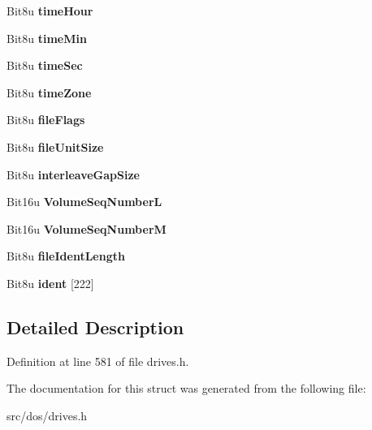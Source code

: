 \begin{DoxyCompactItemize}
\item 
\hypertarget{structisoDirEntry_ad5f7d5ba46e893d19ef699d39a44b875}{Bit8u {\bfseries time\-Hour}}\label{structisoDirEntry_ad5f7d5ba46e893d19ef699d39a44b875}

\item 
\hypertarget{structisoDirEntry_a8babe3c17f3931ffbe6cbba20cfb18b8}{Bit8u {\bfseries time\-Min}}\label{structisoDirEntry_a8babe3c17f3931ffbe6cbba20cfb18b8}

\item 
\hypertarget{structisoDirEntry_aeeda5230d96dd1fc08463136d84f673b}{Bit8u {\bfseries time\-Sec}}\label{structisoDirEntry_aeeda5230d96dd1fc08463136d84f673b}

\item 
\hypertarget{structisoDirEntry_a989029e709520fd23b8dbe878b66e729}{Bit8u {\bfseries time\-Zone}}\label{structisoDirEntry_a989029e709520fd23b8dbe878b66e729}

\item 
\hypertarget{structisoDirEntry_a6c73c88e3eb3329d826091048233e783}{Bit8u {\bfseries file\-Flags}}\label{structisoDirEntry_a6c73c88e3eb3329d826091048233e783}

\item 
\hypertarget{structisoDirEntry_a079492a83780a0316e44bc79b53102e1}{Bit8u {\bfseries file\-Unit\-Size}}\label{structisoDirEntry_a079492a83780a0316e44bc79b53102e1}

\item 
\hypertarget{structisoDirEntry_a6075892ffd1990542c8e68deb4621ddb}{Bit8u {\bfseries interleave\-Gap\-Size}}\label{structisoDirEntry_a6075892ffd1990542c8e68deb4621ddb}

\item 
\hypertarget{structisoDirEntry_ac4632844fa457e6a3efe05744db8e08e}{Bit16u {\bfseries Volume\-Seq\-Number\-L}}\label{structisoDirEntry_ac4632844fa457e6a3efe05744db8e08e}

\item 
\hypertarget{structisoDirEntry_a993c6f1d2836d163140d7c447da856ee}{Bit16u {\bfseries Volume\-Seq\-Number\-M}}\label{structisoDirEntry_a993c6f1d2836d163140d7c447da856ee}

\item 
\hypertarget{structisoDirEntry_a80c4c5121bb984a0d310d897f1cfaecb}{Bit8u {\bfseries file\-Ident\-Length}}\label{structisoDirEntry_a80c4c5121bb984a0d310d897f1cfaecb}

\item 
\hypertarget{structisoDirEntry_adcd0165ef3a6a392c001c2c3d0326b98}{Bit8u {\bfseries ident} \mbox{[}222\mbox{]}}\label{structisoDirEntry_adcd0165ef3a6a392c001c2c3d0326b98}

\end{DoxyCompactItemize}


\subsection{Detailed Description}


Definition at line 581 of file drives.\-h.



The documentation for this struct was generated from the following file\-:\begin{DoxyCompactItemize}
\item 
src/dos/drives.\-h\end{DoxyCompactItemize}
